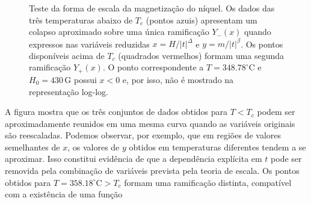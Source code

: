 \documentclass[11pt,a4paper]{article}
\begin{document}
\begin{figure}[H]
\centering
{}
%
\caption{
Teste da forma de escala da magnetização do níquel.
Os dados das três temperaturas abaixo de $T_c$ (pontos azuis) apresentam um colapso
aproximado sobre uma única ramificação $Y_-(x)$ quando expressos nas
variáveis reduzidas
$x=H/|t|^\Delta$ e $y=m/|t|^\beta$.
Os pontos disponíveis acima de $T_c$ (quadrados vermelhos) formam uma segunda ramificação
$Y_+(x)$. O ponto correspondente a
$T=348.78^\circ\mathrm C$ e $H_0=430\,\mathrm G$ possui $x<0$ e, por
isso, não é mostrado na representação log-log.
}
\label{fig:colapso_Ni}
\end{figure}
%
A figura mostra que os três conjuntos de dados obtidos para
$T<T_c$ podem ser aproximadamente reunidos em uma mesma curva quando
as variáveis originais são reescaladas. Podemos observar, por exemplo, que em regiões de valores semelhantes de $x$, os valores de $y$ obtidos em temperaturas diferentes tendem a se aproximar. Isso constitui evidência de que a dependência explícita em $t$ pode ser removida pela combinação de variáveis prevista pela teoria de escala. Os pontos obtidos para $T=358.18^\circ\mathrm C>T_c$ formam uma ramificação distinta, compatível com a existência de uma função
\end{document}

